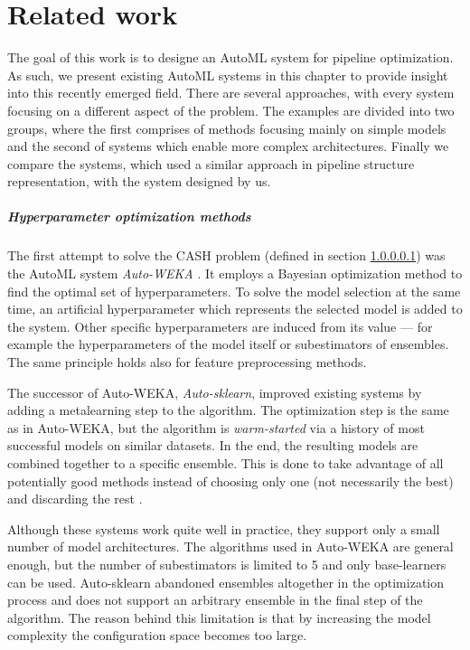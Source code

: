 \chapter{Related work} \label{ch2:related}
The goal of this work is to designe an AutoML system for pipeline optimization.
As such, we present existing AutoML systems in this chapter to provide insight
into this recently emerged field. There are several approaches, with every system
focusing on a different aspect of the problem. The examples are divided into
two groups, where the first comprises of methods focusing mainly on simple
models and the second of systems which enable more complex architectures.
Finally we compare the systems, which used a similar approach in
pipeline structure representation, with the system designed by us.

\paragraph{Hyperparameter optimization methods} \label{CASH}
The first attempt to solve the CASH problem (defined in section \ref{CASH})
was the AutoML system \emph{Auto-WEKA}
\citep{DBLP:journals/corr/abs-1208-3719}. It employs a Bayesian optimization
method to find the optimal set of hyperparameters. To solve the model selection
at the same time, an artificial hyperparameter which represents the selected
model is added to the system. Other specific hyperparameters are induced from its
value --- for example the hyperparameters of the model itself or subestimators of
ensembles. The same principle holds also for feature preprocessing methods.

The successor of Auto-WEKA, \emph{Auto-sklearn}, improved existing systems by
adding a metalearning step to the algorithm. The optimization step is the same
as in Auto-WEKA, but the algorithm is \emph{warm-started} via a history of most
successful models on similar datasets. In the end, the resulting models are
combined together to a specific ensemble. This is done to take advantage of all
potentially good methods instead of choosing only one (not necessarily the best)
and discarding the rest \citep{Feurer:2015:ERA:2969442.2969547}.

Although these systems work quite well in practice, they support only a small
number of model architectures. The algorithms used in Auto-WEKA are general
enough, but the number of subestimators is limited to 5 and only base-learners can
be used. Auto-sklearn abandoned ensembles altogether in the optimization process
and does not support an arbitrary ensemble in the final step of the algorithm.
The reason behind this limitation is that by increasing the model complexity the
configuration space becomes too large.

